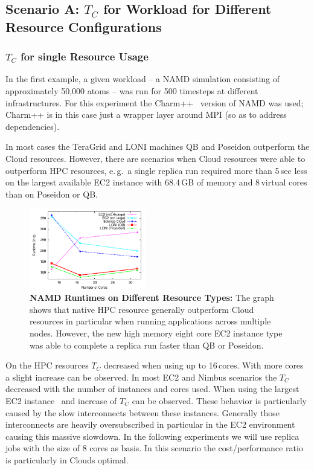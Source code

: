 \documentclass[conference,final]{IEEEtran}
\newcommand{\up}{\vspace*{-1em}}
\newcommand{\tc}{$T_{C}$ }
\begin{document}
\subsection{Scenario A: \tc for Workload for Different Resource
  Configurations}
\up

\subsubsection{\tc for single Resource Usage}

In the first example, a given workload -- a NAMD simulation consisting
of approximately 50,000 atoms -- was run for 500 timesteps at different
infrastructures. For this experiment the Charm++~\cite{871085} version
of NAMD was used; Charm++ is in this case just a wrapper layer around
MPI (so as to address dependencies).

In most cases the TeraGrid and LONI machines QB and Poseidon
outperform the Cloud resources.  However, there are scenarios when
Cloud resources were able to outperform HPC resources, e.\,g.\ a
single replica run required more than 5\,sec less on the largest
available EC2 instance with 68.4\,GB of memory and 8\,virtual cores
than on Poseidon or QB.

\begin{figure}[htbp]
    \centering
    \includegraphics[width=0.45\textwidth]{performance/namd_run.pdf}
    \caption{\textbf{NAMD Runtimes on Different Resource Types: } The
      graph shows that native HPC resource generally outperform Cloud
      resources in particular when running applications across
      multiple nodes. However, the new high memory eight core EC2
      instance type was able to complete a replica run faster than QB
      or Poseidon.\up}
    \label{fig:performance_namd_run}
\end{figure}

On the HPC resources \tc decreased when using up to 16\,cores. With
more cores a slight increase can be observed. In most EC2 and Nimbus
scenarios the \tc decreased with the number of instances and cores
used. When using the largest EC2 instance~\cite{new-ec2} and increase
of \tc can be observed. These behavior is particularly caused by the
slow interconnects between these instances. Generally those
interconnects are heavily oversubscribed in particular in the EC2
environment causing this massive slowdown. In the following
experiments we will use replica jobs with the size of 8 cores as
basis. In this scenario the cost/performance ratio is particularly in
Clouds optimal.
\end{document}
